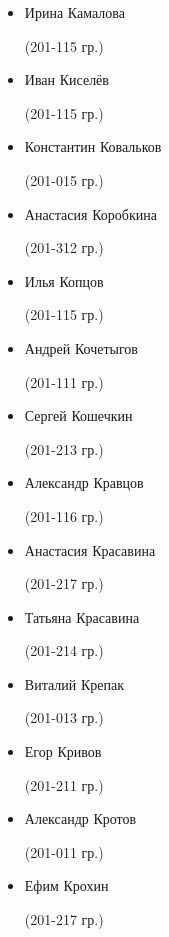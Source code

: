 \begin{multicols}{2}
\begin{small}
\begin{itemize}[leftmargin=0.5em]
	\item[] Ирина Камалова\begin{tiny} (201-115 гр.)\end{tiny}
	\item[] Иван Киселёв\begin{tiny} (201-115 гр.)\end{tiny}
	\item[] Константин Ковальков\begin{tiny} (201-015 гр.)\end{tiny}
	\item[] Анастасия Коробкина\begin{tiny} (201-312 гр.)\end{tiny} %
	\item[] Илья Копцов\begin{tiny} (201-115 гр.)\end{tiny} %
	\item[] Андрей Кочетыгов\begin{tiny} (201-111 гр.)\end{tiny} %
	\item[] Сергей Кошечкин\begin{tiny} (201-213 гр.)\end{tiny}
	\item[] Александр Кравцов\begin{tiny} (201-116 гр.)\end{tiny}
	\item[] Анастасия Красавина\begin{tiny} (201-217 гр.)\end{tiny} %
	\item[] Татьяна Красавина\begin{tiny} (201-214 гр.)\end{tiny} %
	\item[] Виталий Крепак\begin{tiny} (201-013 гр.)\end{tiny}
	\item[] Егор Кривов\begin{tiny} (201-211 гр.)\end{tiny}
	\item[] Александр Кротов\begin{tiny} (201-011 гр.)\end{tiny}
	\item[] Ефим Крохин\begin{tiny} (201-217 гр.)\end{tiny} %

\end{itemize}
\end{small}
\end{multicols}

